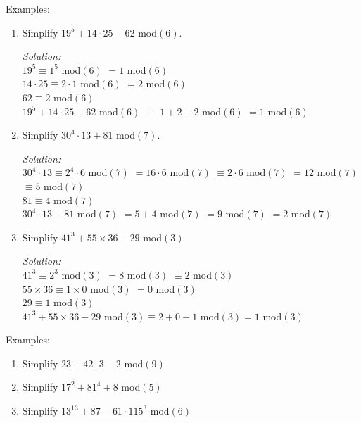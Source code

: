 \documentclass[16pt]{article}
\theoremstyle{remark}
\begin{document}
Examples:
\begin{enumerate}
\item Simplify $19^5 + 14\cdot 25-62$ mod$(6)$.
\begin{mdframed}[style=TheoremFrame]
\textit{Solution:}\\

$19^5 \equiv 1^5$ mod$(6)$ $=1$ mod$(6)$\\
$14 \cdot 25 \equiv 2 \cdot 1$ mod$(6)$ $= 2$ mod$(6)$\\
$62 \equiv 2$ mod$(6)$\\

$19^5 + 14\cdot 25-62$ mod$(6)$ $\equiv$ $1+2-2$ mod$(6)$ $=1$ mod$(6)$
\end{mdframed}

\item Simplify $30^4 \cdot 13 + 81$ mod$(7)$.
\begin{mdframed}[style=TheoremFrame]
\textit{Solution:}\\

$30^4 \cdot 13 \equiv 2^4 \cdot 6$ mod$(7)$ $= 16 \cdot 6$ mod$(7)$ $\equiv 2\cdot 6$ mod$(7)$ $=12$ mod$(7)$ $\equiv 5$ mod$(7)$ \\
$81 \equiv 4$ mod$(7)$\\

$30^4 \cdot 13 + 81$ mod$(7)$ $= 5 + 4$ mod$(7)$ $=9$ mod$(7)$ $=2$ mod$(7)$
\end{mdframed}
\newpage
\item Simplify $41^3 + 55 \times 36 - 29$ mod$(3)$
\begin{mdframed}[style=TheoremFrame]
\textit{Solution:}\\

$41^3 \equiv 2^3$ mod$(3)$ $= 8$ mod$(3)$ $\equiv 2$ mod$(3)$\\
$55 \times 36 \equiv 1 \times 0$ mod$(3)$ $= 0$ mod$(3)$\\
$29 \equiv 1$ mod$(3)$\\

$41^3 + 55 \times 36 - 29$ mod$(3) \equiv 2 + 0 - 1$ mod$(3) = 1$ mod$(3)$
\end{mdframed}
\end{enumerate}

Examples:
\begin{enumerate}
\item Simplify $23+42\cdot 3 - 2$ mod$(9)$
\vspace{5cm}
\item Simplify $17^2 + 81^4 + 8$ mod$(5)$
\vspace{5cm}
\item Simplify $13^{13} + 87-61\cdot115^3$ mod$(6)$
\end{enumerate}
\end{document}
